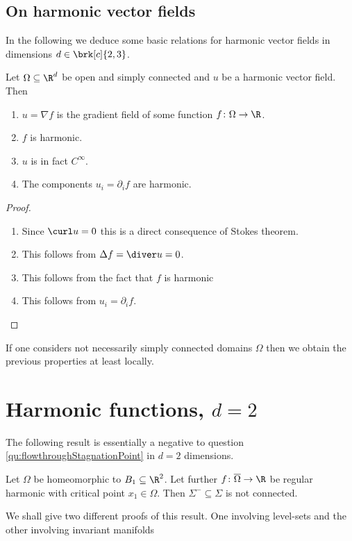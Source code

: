 \subsection{On harmonic vector fields}

In the following we deduce some basic relations for harmonic vector fields in dimensions $d\in\brk[c]{2,3}$.
\begin{proposition}\label{pr:n2:hvf:simplyConnected}
  Let $\Omega\subseteq\R^d$ be open and simply connected and $u$ be a harmonic vector field. Then
  \begin{enumerate}
    \item 
    $u=\nabla f$ is the gradient field of some
    function $f\colon\Omega\to\R$.
    \item  $f$ is harmonic.
    \item $u$ is in fact $C^\infty$.
    \item The components $u_i=\partial_if$ are harmonic.
  \end{enumerate}
\end{proposition}
\begin{proof}
  \begin{enumerate}
    \item 
    Since $\curl u =0$ this is a direct consequence of Stokes theorem.
    \item This follows from $\Delta f = \diver u=0$.
    \item This follows from the fact that $f$ is harmonic
    \item This follows from $u_i=\partial_if$.
  \end{enumerate}
\end{proof}

If one considers not necessarily simply connected domains $\Omega$ then we obtain the previous
properties at least locally.

\newpage

\section{Harmonic functions, $d=2$}

The following result is essentially a negative to question \ref{qu:flowthroughStagnationPoint} in $d=2$ dimensions.
\begin{proposition}\label{pr:n2:hf:nonExistence}
  Let $\Omega$ be homeomorphic to $B_1\subseteq\R^2$. Let further $f\colon\overline{\Omega}\to\R$ be regular harmonic  
  with critical point $x_1\in\Omega$. Then $\Sigma^-\subseteq\Sigma$ is not connected.
\end{proposition}
We shall give two different proofs of this result. One involving level-sets and the other involving invariant manifolds


